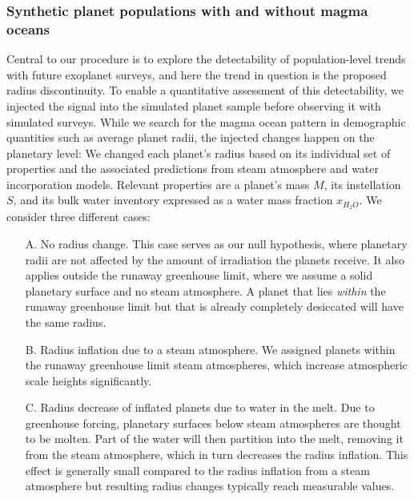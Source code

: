 \documentclass[modern]{aastex631}
\begin{document}
\subsubsection{Synthetic planet populations with and without magma oceans}
\begin{note}
    Central to our procedure is to explore the detectability of population-level trends with future exoplanet surveys, and here the trend in question is the proposed radius discontinuity.
    To enable a quantitative assessment of this detectability, we injected the signal into the simulated planet sample before observing it with simulated surveys.
    While we search for the magma ocean pattern in demographic quantities such as average planet radii, the injected changes happen on the planetary level: We changed each planet's radius based on its individual set of properties and the associated predictions from steam atmosphere and water incorporation models.
    Relevant properties are a planet's mass $M$, its instellation $S$, and its bulk water inventory expressed as a water mass fraction $x_{H_2O}$.
    We consider three different cases:
    \begin{itemize}
   \item[A.] No radius change.
    This case serves as our null hypothesis, where planetary radii are not affected by the amount of irradiation the planets receive.
    It also applies outside the runaway greenhouse limit, where we assume a solid planetary surface and no steam atmosphere.
        A planet that lies \textit{within} the runaway greenhouse limit but that is already completely desiccated will have the same radius. 
   \item[B.] Radius inflation due to a steam atmosphere.
    We assigned planets within the runaway greenhouse limit steam atmospheres, which increase atmospheric scale heights significantly.
   \item[C.] Radius decrease of inflated planets due to water in the melt.
    Due to greenhouse forcing, planetary surfaces below steam atmospheres are thought to be molten.
    Part of the water will then partition into the melt, removing it from the steam atmosphere, which in turn decreases the radius inflation.
    This effect is generally small compared to the radius inflation from a steam atmosphere but resulting radius changes typically reach measurable values.
    \end{itemize}
\end{note}
\end{document}
